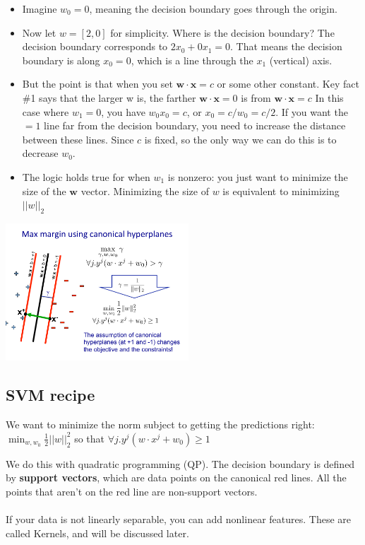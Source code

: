 \begin{itemize}
	\item Imagine $w_0 = 0$, meaning the decision boundary goes through the origin.  \hfill \\
	\item Now let $w = [2, 0]$ for simplicity.    
		Where is the decision boundary?  
		The decision boundary corresponds to $2 x_0 + 0 x_1 = 0$.  
		That means the decision boundary is along $x_0 = 0$, which is a line through the $x_1$ (vertical) axis. 
	\item But the point is that when you set $\bm{w} \cdot \bm{x} = c$ or some other constant.
		Key fact \#1 says that the larger w is, the farther $\bm{w} \cdot \bm{x} = 0$ is from $\bm{w} \cdot \bm{x} = c$  
		In this case where $w_1 = 0$, you have  $w_0 x_0 = c$, or $x_0 = c/w_0 = c/2$.  
		If you want the $=1$ line far from the decision boundary, you need to increase the distance between these lines.
		Since $c$ is fixed, so the only way we can do this is to decrease $w_0$. 
	\item The logic holds true for when $w_1$ is nonzero: you just want to minimize the size of the $\bm{w}$ vector.
		Minimizing the size of $w$ is equivalent to minimizing $||w||_2$ 
\end{itemize}

\includegraphics[width=2.7in]{figures/max_margin_using_canonical_hyperplanes.pdf}

\subsection{SVM recipe}
We want to minimize the norm subject to getting the predictions right:  \hfill \\
$\displaystyle  \min_{w, w_0} \frac{1}{2} ||w||_2^2$ so that $\forall j . y^j(w \cdot x^j + w_0) \geq 1$

We do this with quadratic programming (QP). 
The decision boundary is defined by \textbf{support vectors}, which are data points on the canonical red lines. 
All the points that aren't on the red line are non-support vectors. \hfill \\
 \hfill \\
 If your data is not linearly separable, you can add nonlinear features.
 These are called Kernels, and will be discussed later. 
 
